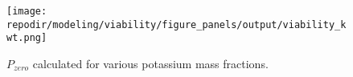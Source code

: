 \begin{figure}[h]
    \centering
    \texttt{[image: \\repodir/modeling/viability/figure\_panels/output/viability\_kwt.png]} 
    \caption{$P_{zero}$ calculated for various potassium mass fractions. }
    \label{fig:SI_P_zero_kwt}
\end{figure}





